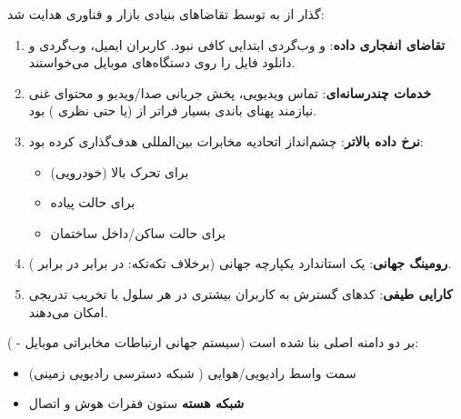 

\CNchained{}

گذار از  به  توسط تقاضاهای بنیادی بازار و فناوری هدایت شد:

\begin{enumerate}
\def\labelenumi{\arabic{enumi}.}
\tightlist
\item
  \textbf{تقاضای انفجاری داده}:  و وب‌گردی ابتدایی  کافی نبود. کاربران ایمیل، وب‌گردی و دانلود فایل را روی دستگاه‌های موبایل می‌خواستند.
\item
  \textbf{خدمات چندرسانه‌ای}: تماس ویدیویی، پخش جریانی صدا/\allowbreak{}ویدیو و محتوای غنی نیازمند پهنای باندی بسیار فراتر از  (یا حتی  نظری ) بود.
\item
  \textbf{نرخ داده بالاتر}: چشم‌انداز  اتحادیه مخابرات بین‌المللی  هدف‌گذاری کرده بود:

  \begin{itemize}
  \tightlist
  \item
     برای تحرک بالا (خودرویی)
  \item
     برای حالت پیاده
  \item
     برای حالت ساکن/\allowbreak{}داخل ساختمان
  \end{itemize}
\item
  \textbf{رومینگ جهانی}: یک استاندارد یکپارچه جهانی (برخلاف  تکه‌تکه:  در برابر  در برابر ).
\item
  \textbf{کارایی طیفی}: کدهای گسترش  به کاربران بیشتری در هر سلول با تخریب تدریجی امکان می‌دهند.
\end{enumerate}





 ( - سیستم جهانی ارتباطات مخابراتی موبایل) بر دو دامنه اصلی بنا شده است:

\begin{itemize}
\tightlist
\item
   (شبکه دسترسی رادیویی زمینی )  سمت واسط رادیویی/\allowbreak{}هوایی
\item
  \textbf{شبکه هسته }  ستون فقرات هوش و اتصال
\end{itemize}

